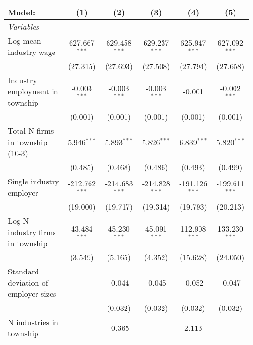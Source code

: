 \begingroup
\centering
\begin{tabular}{lccccc}
   \tabularnewline \midrule \midrule
   Model:                               & (1)              & (2)              & (3)              & (4)              & (5)\\  
   \midrule
   \emph{Variables}\\
   Log mean industry wage               & 627.667$^{***}$  & 629.458$^{***}$  & 629.237$^{***}$  & 625.947$^{***}$  & 627.092$^{***}$\\   
                                        & (27.315)         & (27.693)         & (27.508)         & (27.794)         & (27.658)\\   
   Industry employment in township      & -0.003$^{***}$   & -0.003$^{***}$   & -0.003$^{***}$   & -0.001           & -0.002$^{***}$\\   
                                        & (0.001)          & (0.001)          & (0.001)          & (0.001)          & (0.001)\\   
   Total N firms in township (10-3)     & 5.946$^{***}$    & 5.893$^{***}$    & 5.826$^{***}$    & 6.839$^{***}$    & 5.820$^{***}$\\   
                                        & (0.485)          & (0.468)          & (0.486)          & (0.493)          & (0.499)\\   
   Single industry employer             & -212.762$^{***}$ & -214.683$^{***}$ & -214.828$^{***}$ & -191.126$^{***}$ & -199.611$^{***}$\\   
                                        & (19.000)         & (19.717)         & (19.314)         & (19.793)         & (20.213)\\   
   Log N industry firms in township     & 43.484$^{***}$   & 45.230$^{***}$   & 45.091$^{***}$   & 112.908$^{***}$  & 133.230$^{***}$\\   
                                        & (3.549)          & (5.165)          & (4.352)          & (15.628)         & (24.050)\\   
   Standard deviation of employer sizes &                  & -0.044           & -0.045           & -0.052           & -0.047\\   
                                        &                  & (0.032)          & (0.032)          & (0.032)          & (0.032)\\   
   N industries in township             &                  & -0.365           &                  & 2.113            &   \\   

\end{tabular}
